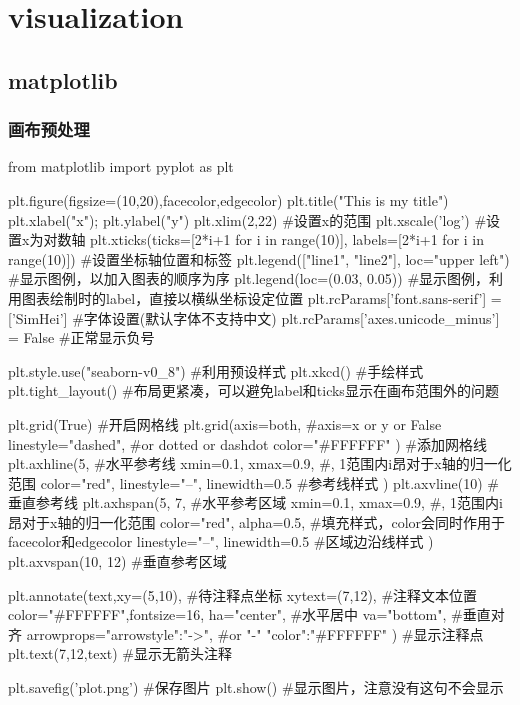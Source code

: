 \section{visualization}

  \subsection{matplotlib}
    \subsubsection{画布预处理}
      \begin{codeblock}[language=python, caption={basic setup of plt}]
        from matplotlib import pyplot as plt

        plt.figure(figsize=(10,20),facecolor,edgecolor)
        plt.title("This is my title")
        plt.xlabel("x"); plt.ylabel("y")
        plt.xlim(2,22) #设置x的范围
        plt.xscale('log') #设置x为对数轴
        plt.xticks(ticks=[2*i+1 for i in range(10)], 
                   labels=[2*i+1 for i in range(10)]) #设置坐标轴位置和标签
        plt.legend(["line1", "line2"], loc="upper left") #显示图例，以加入图表的顺序为序
        plt.legend(loc=(0.03, 0.05)) #显示图例，利用图表绘制时的label，直接以横纵坐标设定位置
        plt.rcParams['font.sans-serif'] = ['SimHei'] #字体设置(默认字体不支持中文)
        plt.rcParams['axes.unicode_minus'] = False #正常显示负号

        plt.style.use("seaborn-v0_8") #利用预设样式
        plt.xkcd() #手绘样式
        plt.tight_layout() #布局更紧凑，可以避免label和ticks显示在画布范围外的问题

        plt.grid(True) #开启网格线
        plt.grid(axis=both, #axis=x or y or False
                linestyle="dashed", #or dotted or dashdot
                color="#FFFFFF"
        ) #添加网格线
        plt.axhline(5, #水平参考线
                    xmin=0.1, xmax=0.9, #, 1\rbrack 范围内i昂对于x轴的归一化范围
                    color="red", linestyle="--", linewidth=0.5 #参考线样式
        ) 
        plt.axvline(10) #垂直参考线
        plt.axhspan(5, 7, #水平参考区域
                    xmin=0.1, xmax=0.9, #, 1\rbrack 范围内i昂对于x轴的归一化范围
                    color="red", alpha=0.5, #填充样式，color会同时作用于facecolor和edgecolor
                    linestyle="--", linewidth=0.5 #区域边沿线样式
        ) 
        plt.axvspan(10, 12) #垂直参考区域

        plt.annotate(text,xy=(5,10), #待注释点坐标
                    xytext=(7,12), #注释文本位置
                    color="#FFFFFF",fontsize=16,
                    ha="center", #水平居中
                    va="bottom", #垂直对齐
                    arrowprops={"arrowstyle":"->", #or "-"
                                "color":"#FFFFFF"}
        ) #显示注释点
        plt.text(7,12,text) #显示无箭头注释

        plt.savefig('plot.png') #保存图片
        plt.show() #显示图片，注意没有这句不会显示
      \end{codeblock}

